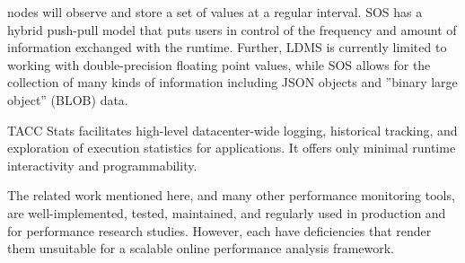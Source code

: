 nodes will observe and store a set of values at a regular interval.
%
SOS has a hybrid push-pull model that puts users in control of the
frequency and amount of information exchanged with the runtime.
%
Further, LDMS is currently limited to working with double-precision
floating point values, while SOS allows for the collection of many
kinds of information including JSON objects and ''binary large
object'' (BLOB) data.
%
\par
%
TACC Stats \cite{evans2014comprehensive} facilitates high-level
datacenter-wide logging, historical tracking, and exploration of
execution statistics for applications.  It offers only minimal
runtime interactivity and programmability.
%

The related work mentioned here, and many other performance monitoring
tools, are well-implemented, tested, maintained, and regularly used
in production and for performance research studies.
%
However, each have deficiencies that render them unsuitable for a scalable
online performance analysis framework.
%



